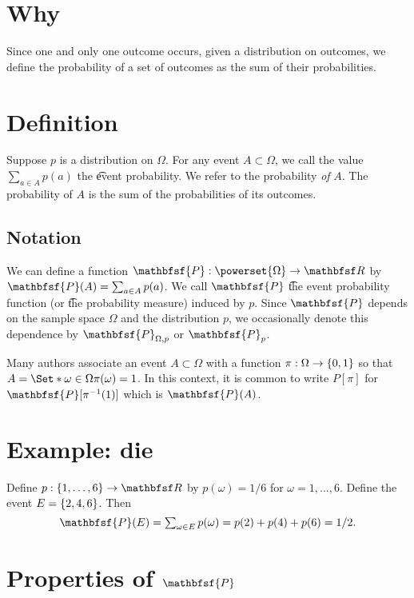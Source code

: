 

\section*{Why}

Since one and only one outcome occurs, given a distribution on outcomes, we define the probability of a set of outcomes as the sum of their probabilities.

\section*{Definition}

Suppose $p$ is a distribution on $\Omega $.
For any event $A \subset \Omega $, we call the value $\sum_{a \in A} p(a)$ the \t{event probability}.
We refer to the probability \textit{of} $A$.
The probability of $A$ is the sum of the probabilities of its outcomes.

\subsection*{Notation}

We can define a function $\mathbfsf{P} : \powerset{\Omega } \to \R $ by $\mathbfsf{P} (A) = \sum_{a \in A} p(a)$.
We call $\mathbfsf{P} $ \t{the event probability function} (or \t{the probability measure}) induced by $p$.
Since $\mathbfsf{P} $ depends on the sample space $\Omega $ and the distribution $p$, we occasionally denote this dependence by $\mathbfsf{P} _{\Omega , p}$ or $\mathbfsf{P} _p$.

Many authors associate an event $A \subset \Omega $ with a function $\pi : \Omega  \to \{0, 1\}$ so that $A = \Set*{\omega  \in \Omega }{\pi (\omega ) = 1}$.
In this context, it is common to write $P[\pi ]$ for $\mathbfsf{P} [\pi ^{-1}(1)]$ which is $\mathbfsf{P} (A)$.

\section*{Example: die}

Define $p: \set{1, \dots , 6} \to \R $ by $p(\omega ) = 1/6$ for $\omega  = 1, \dots , 6$.
Define the event $E = \{2, 4, 6\}$.
Then
    \[
\textstyle
\mathbfsf{P} (E) = \sum_{\omega  \in E} p(\omega ) = p(2) + p(4) + p(6) = 1/2.
    \]

\section*{Properties of $\mathbfsf{P} $}

